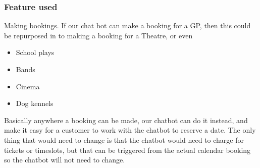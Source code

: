 \documentclass{article}
\begin{document}
\subsubsection{Feature used}
Making bookings. If our chat bot can make a booking for a GP, then this could be repurposed in to making a booking for a Theatre, or even 
\begin{itemize}
    \item School plays
    \item Bands
    \item Cinema
    \item Dog kennels
\end{itemize}
Basically anywhere a booking can be made, our chatbot can do it instead, and make it easy for a customer to work with the chatbot to reserve a date. The only thing that would need to change is that the chatbot would need to charge for tickets or timeslots, but that can be triggered from the actual calendar booking so the chatbot will not need to change.


\end{document}
